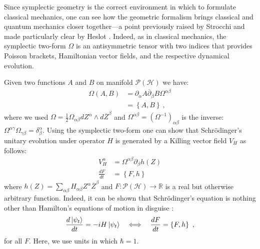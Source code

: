 \documentclass[draft,nofootinbib,pre,twocolumn,showpacs,showkeys,groupaddress,preprintnumbers,floatfix]{revtex4-1}
\newcommand{\1}{\mathbbm{1}}
\begin{document}
Since symplectic geometry is the correct environment in which to formulate
classical mechanics, one can see how the geometric formalism brings classical
and quantum mechanics closer together---a point previously raised by Strocchi
\cite{STROCCHI1966} and made particularly clear by Heslot \cite{Heslot1985}.
Indeed, as in classical mechanics, the symplectic two-form $\Omega$ is an
antisymmetric tensor with two indices that provides Poisson brackets,
Hamiltonian vector fields, and the respective dynamical evolution.

Given two functions $A$ and $B$ on manifold $\mathcal{P}(\mathcal{H})$ we have:
\begin{align*}
\Omega(A,B) & = \partial_\alpha A
  \overline{\partial}_\beta B \Omega^{\alpha \beta} \\
  & = \left\{ A,B\right\}
  ~,
\end{align*}
where we used $\Omega = \frac{1}{2} \Omega_{\alpha \beta} dZ^\alpha \wedge
d\overline{Z}^\beta$ and $\Omega^{\alpha \beta} = (\Omega^{-1})_{\alpha \beta}$
is the inverse: $\Omega^{\alpha \gamma} \Omega_{\gamma \beta} =
\delta^\alpha_\beta$. Using the symplectic two-form one can show that
Schr\"odinger's unitary evolution under operator $H$ is generated by a Killing
vector field $V_H$ as follows:
\begin{subequations}
\begin{align}
V_H^\alpha & = \Omega^{\alpha \beta} \partial_\beta h(Z) \\
\frac{dF}{dt} & = \left\{F,h \right\} 
\end{align}
\label{eq:LiouvilleDynamics}
\end{subequations}
where $h(Z) = \sum_{\alpha \beta}H_{\alpha \beta} Z^\alpha \overline{Z}^\beta$
and $F : \mathcal{P}(\mathcal{H}) \to \mathbb{R}$ is a real but otherwise
arbitrary function. Indeed, it can be shown that Schr\"odinger's equation is
nothing other than Hamilton's equations of motion in disguise
\cite{Bengtsson2017,Heslot1985}:
\begin{align}
\frac{d \ket{\psi_t}}{dt} = -i H \ket{\psi_t} \quad \Longleftrightarrow \quad  \frac{dF}{dt} = \left\{ F, h\right\}
  ~,
\label{eq:unitary_evolution}
\end{align}
for all $F$. Here, we use units in which $\hbar = 1$. 
\end{document}
